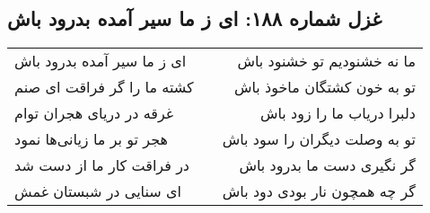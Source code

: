 \begin{center}
\section*{غزل شماره ۱۸۸: ای ز ما سیر آمده بدرود باش}
\label{sec:188}
\begin{longtable}{l p{0.5cm} r}
ای ز ما سیر آمده بدرود باش
&&
ما نه خشنودیم تو خشنود باش
\\
کشته ما را گر فراقت ای صنم
&&
تو به خون کشتگان ماخوذ باش
\\
غرقه در دریای هجران توام
&&
دلبرا دریاب ما را زود باش
\\
هجر تو بر ما زیانی‌ها نمود
&&
تو به وصلت دیگران را سود باش
\\
در فراقت کار ما از دست شد
&&
گر نگیری دست ما بدرود باش
\\
ای سنایی در شبستان غمش
&&
گر چه همچون نار بودی دود باش
\\
\end{longtable}
\end{center}

